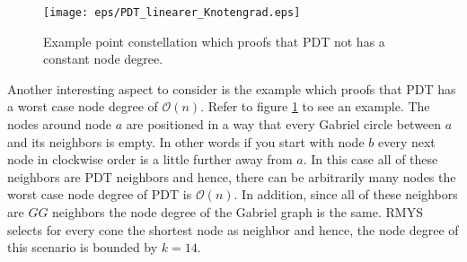 \begin{figure}[h!]
\centering
\texttt{[image: eps/PDT\_linearer\_Knotengrad.eps]}
\caption{Example point constellation which proofs that PDT not has a constant node degree. }
\label{fig:PDT_linearer_Knotengrad}
\end{figure}

Another interesting aspect to consider is the example which proofs that PDT has a worst case node degree of $\mathcal{O}(n) $.
Refer to figure \ref{fig:PDT_linearer_Knotengrad} to see an example.
The nodes around node $a $ are positioned in a way that every Gabriel circle between $a $ and its neighbors is empty.
In other words if you start with node $b $ every next node in clockwise order is a little further away from $a $.
In this case all of these neighbors are PDT neighbors and hence, there can be arbitrarily many nodes the worst case node degree of PDT is $\mathcal{O}(n) $.
In addition, since all of these neighbors are $GG $ neighbors the node degree of the Gabriel graph is the same.
RMYS selects for every cone the shortest node as neighbor and hence, the node degree of this scenario is bounded by $k=14 $.




